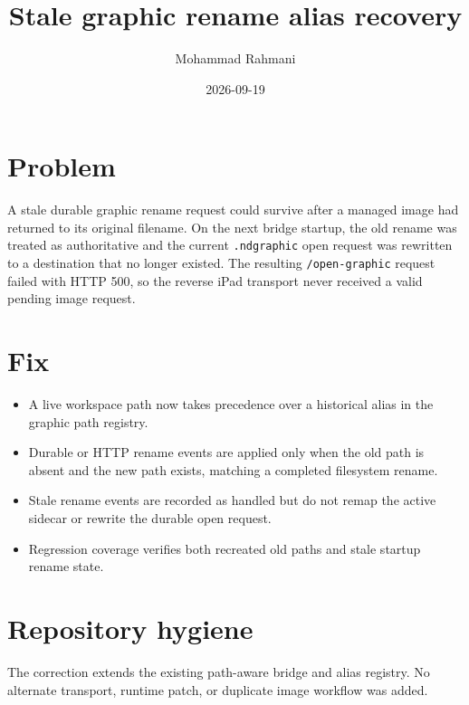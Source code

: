 \documentclass[a4paper]{article}
\title{Stale graphic rename alias recovery}
\date{2026-09-19}
\author{Mohammad Rahmani}
\begin{document}
   \maketitle

   \begin{preview}
      \section{Problem}
      A stale durable graphic rename request could survive after a managed image had
      returned to its original filename. On the next bridge startup, the old rename
      was treated as authoritative and the current \texttt{.ndgraphic} open request
      was rewritten to a destination that no longer existed. The resulting
      \texttt{/open-graphic} request failed with HTTP 500, so the reverse iPad
      transport never received a valid pending image request.

      \section{Fix}
      \begin{itemize}
         \item A live workspace path now takes precedence over a historical alias in the graphic path registry.
         \item Durable or HTTP rename events are applied only when the old path is absent and the new path exists, matching a completed filesystem rename.
         \item Stale rename events are recorded as handled but do not remap the active sidecar or rewrite the durable open request.
         \item Regression coverage verifies both recreated old paths and stale startup rename state.
      \end{itemize}

      \section{Repository hygiene}
      The correction extends the existing path-aware bridge and alias registry. No
      alternate transport, runtime patch, or duplicate image workflow was added.
   \end{preview}

   
   
\end{document}
